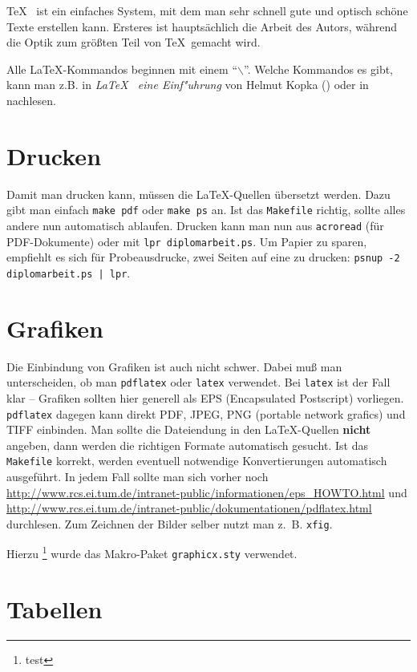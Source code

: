 \documentclass[%
	12pt,		%
	headinclude,	%
	a4paper,	%
	pointlessnumbers, %
	changebar,      %
	liststotoc,	%
	bibtotoc,
	idxtotoc,
	]{diplomarbeit}
\begin{document}
\TeX ~ ist ein einfaches System, mit dem man sehr schnell gute und optisch
schöne Texte erstellen kann. Ersteres ist hauptsächlich die Arbeit
des Autors, während die Optik zum größten Teil von \TeX\ gemacht wird.

Alle \LaTeX -Kommandos beginnen mit einem ``$\backslash$''.  Welche
Kommandos es gibt, kann man z.B. in {\em \LaTeX ~ eine Einf"uhrung}
von Helmut Kopka (\cite{kopkaEinf:92}) oder in \cite{kopkaErw:92} nachlesen.

\section{Drucken}

Damit man drucken kann, müssen die \LaTeX -Quellen übersetzt
werden. Dazu gibt man einfach {\tt make pdf} oder {\tt make ps}
an. Ist das {\tt Makefile} richtig, sollte alles andere nun
automatisch ablaufen. Drucken kann man nun aus {\tt acroread} (für
PDF-Dokumente) oder mit {\tt lpr diplomarbeit.ps}. Um Papier zu
sparen, empfiehlt es sich für Probeausdrucke, zwei Seiten auf eine zu
drucken: {\tt psnup -2 diplomarbeit.ps | lpr}.

\section{Grafiken}

Die Einbindung von Grafiken ist auch nicht schwer. Dabei muß man
unterscheiden, ob man {\tt pdflatex} oder {\tt latex} verwendet. Bei
{\tt latex} ist der Fall klar -- Grafiken sollten hier generell als
EPS (Encapsulated Postscript) vorliegen. {\tt pdflatex} dagegen kann
direkt PDF, JPEG, PNG (portable network grafics) und TIFF
einbinden. Man sollte die Dateiendung in den \LaTeX -Quellen {\bf
  nicht} angeben, dann werden die richtigen Formate automatisch
gesucht. Ist das {\tt Makefile} korrekt, werden eventuell notwendige
Konvertierungen automatisch ausgeführt. In jedem Fall sollte man sich
vorher noch
\url{http://www.rcs.ei.tum.de/intranet-public/informationen/eps_HOWTO.html}
und
\url{http://www.rcs.ei.tum.de/intranet-public/dokumentationen/pdflatex.html}
durchlesen. Zum Zeichnen der Bilder selber nutzt man z.~B. {\tt xfig}.


Hierzu \footnote{test} wurde das Makro-Paket {\tt graphicx.sty} verwendet.

\section{Tabellen}
\end{document}
